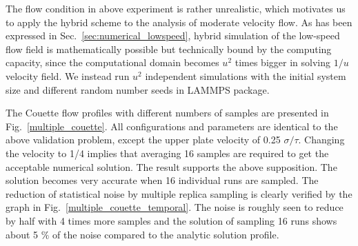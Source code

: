 \documentclass[preprint,12pt]{elsarticle}
\begin{document}




The flow condition in above experiment is rather unrealistic, which motivates us to apply the hybrid scheme to the analysis of moderate velocity flow. As has been expressed in Sec.~\ref{sec:numerical_lowspeed}, hybrid simulation of the low-speed flow field is mathematically possible but technically bound by the computing capacity, since the computational domain becomes $u^2$ times bigger in solving $1/u$ velocity field. We instead run $u^2$ independent simulations with the initial system size and different random number seeds in LAMMPS package. %


The Couette flow profiles with different numbers of samples are presented in Fig.~\ref{multiple_couette}. All configurations and parameters are identical to the above validation problem, except the upper plate velocity of 0.25 $\sigma/\tau$. Changing the velocity to 1/4 implies that averaging 16 samples are required to get the acceptable numerical solution. The result supports the above supposition. The solution becomes very accurate when 16 individual runs are sampled. The reduction of statistical noise by multiple replica sampling is clearly verified by the graph in Fig.~\ref{multiple_couette_temporal}. The noise is roughly seen to reduce by half with 4 times more samples and the solution of sampling 16 runs shows about 5 $\%$ of the noise compared to the analytic solution profile.
\end{document}

